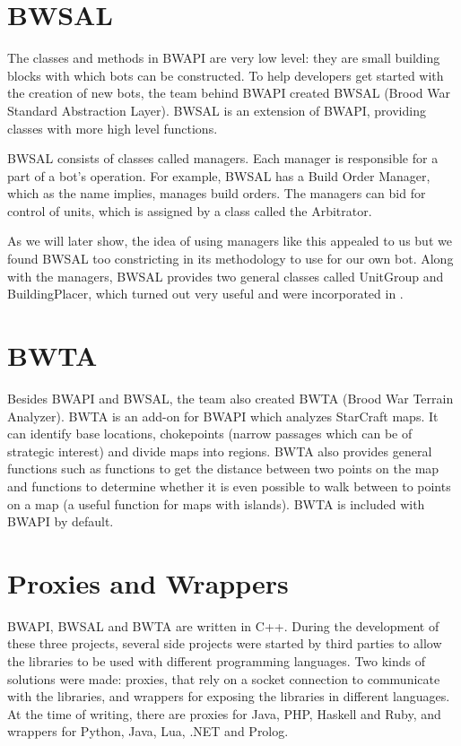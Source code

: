 \section{BWSAL}
\label{sec:bwsal}

The classes and methods in BWAPI are very low level: they are small building blocks with which bots can be constructed. To help developers get started with the creation of new bots, the team behind BWAPI created BWSAL (Brood War Standard Abstraction Layer). BWSAL is an extension of BWAPI, providing classes with more high level functions.

BWSAL consists of classes called managers. Each manager is responsible for a part of a bot's operation. For example, BWSAL has a Build Order Manager, which as the name implies, manages build orders. The managers can bid for control of units, which is assigned by a class called the Arbitrator.

As we will later show, the idea of using managers like this appealed to us but we found BWSAL too constricting in its methodology to use for our own bot. Along with the managers, BWSAL provides two general classes called UnitGroup and BuildingPlacer, which turned out very useful and were incorporated in \massexpand.

\section{BWTA}
\label{sec:bwta}

Besides BWAPI and BWSAL, the team also created BWTA (Brood War Terrain Analyzer). BWTA is an add-on for BWAPI which analyzes StarCraft maps. It can identify base locations, chokepoints (narrow passages which can be of strategic interest) and divide maps into regions. BWTA also provides general functions such as functions to get the distance between two points on the map and functions to determine whether it is even possible to walk between to points on a map (a useful function for maps with islands). BWTA is included with BWAPI by default.

\section{Proxies and Wrappers}

BWAPI, BWSAL and BWTA are written in C++. During the development of these three projects, several side projects were started by third parties to allow the libraries to be used with different programming languages. Two kinds of solutions were made: proxies, that rely on a socket connection to communicate with the libraries, and wrappers for exposing the libraries in different languages. At the time of writing, there are proxies for Java, PHP, Haskell and Ruby, and wrappers for Python, Java, Lua, .NET and Prolog.

